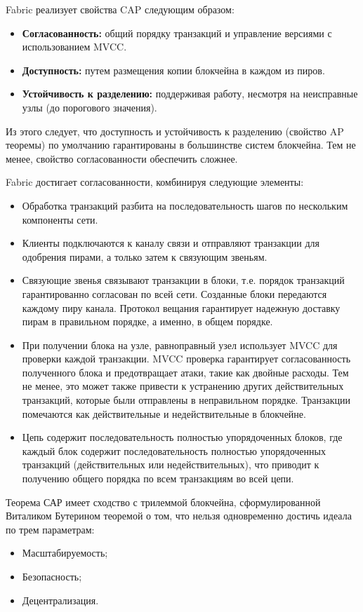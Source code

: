 Fabric реализует свойства CAP следующим образом:
\begin{itemize}
	\item \textbf{Согласованность:} общий порядку транзакций и управление версиями с использованием MVCC.
	\item \textbf{Доступность:} путем размещения копии блокчейна в каждом из пиров.
	\item \textbf{Устойчивость к разделению:} поддерживая работу, несмотря на неисправные узлы (до порогового значения).
\end{itemize}

Из этого следует, что доступность и устойчивость к разделению (свойство AP теоремы) по умолчанию гарантированы в большинстве систем блокчейна. Тем не менее, свойство согласованности обеспечить сложнее.

Fabric достигает согласованности, комбинируя следующие элементы:
\begin{itemize}
	\item Обработка транзакций разбита на последовательность шагов по нескольким компоненты сети.
	\item Клиенты подключаются к каналу связи и отправляют транзакции для одобрения пирами, а только затем к связующим звеньям.
	\item Связующие звенья связывают транзакции в блоки, т.е. порядок транзакций гарантированно согласован по всей сети. Созданные блоки передаются каждому пиру канала. Протокол вещания гарантирует надежную доставку пирам в правильном порядке, а именно, в общем порядке.
	\item При получении блока на узле, равноправный узел использует MVCC для проверки каждой транзакции. MVCC проверка гарантирует согласованность полученного блока и предотвращает атаки, такие как двойные расходы. Тем не менее, это может также привести к устранению других действительных транзакций, которые были отправлены в неправильном порядке. Транзакции помечаются как действительные и недействительные в блокчейне.
	\item Цепь содержит последовательность полностью упорядоченных блоков, где каждый блок содержит последовательность полностью упорядоченных транзакций (действительных или недействительных), что приводит к получению общего порядка по всем транзакциям во всей цепи.
\end{itemize}
 
Теорема САР имеет сходство с трилеммой блокчейна, сформулированной Виталиком Бутерином теоремой о том, что нельзя одновременно достичь идеала по трем параметрам:
\begin{itemize}
	\item Масштабируемость;
	\item Безопасность;
	\item Децентрализация.
\end{itemize}


